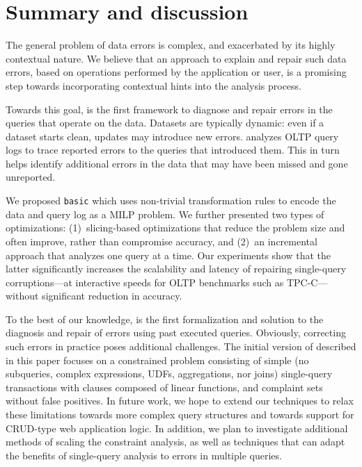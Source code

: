 

\section{Summary and discussion}

The general problem of data errors is complex, and exacerbated by its highly contextual nature.
We believe that an approach to explain and repair such data errors, based on operations performed by the application or user, is a promising step towards incorporating contextual hints into the analysis process.

Towards this goal, \sys is the first framework to diagnose and
repair errors in the queries that operate on the data.
Datasets are typically dynamic: even if a dataset starts clean,
updates may introduce new errors. \sys 
analyzes OLTP query logs to trace reported errors to the queries that
introduced them. This in turn helps identify additional errors
in the data that may have been missed and gone unreported.

We proposed \texttt{basic} which uses non-trivial transformation rules to
encode the data and query log as a MILP problem. We further 
presented two types of optimizations: 
(1)~slicing-based optimizations that reduce the problem
size and often improve, rather than compromise accuracy, and 
(2)~an incremental approach that analyzes one query at a time. 
Our experiments show that the latter significantly increases the scalability and latency of repairing single-query corruptions---at interactive speeds for OLTP benchmarks such as TPC-C---without significant reduction in accuracy.

To the best of our knowledge, \sys is the first formalization and solution to the diagnosis
and repair of errors using past executed queries. 
Obviously, correcting such errors in practice poses additional challenges. 
The initial version of \sys described in this paper focuses on a constrained problem consisting of
simple (no subqueries, complex expressions, UDFs, aggregations, nor joins)
single-query transactions with clauses composed of linear functions, and
complaint sets without false positives.
In future work, we hope to extend our techniques to relax these limitations towards more complex query structures and towards support for CRUD-type web application logic.
In addition, we plan to investigate additional methods of scaling the constraint analysis, 
as well as techniques that can adapt the benefits of single-query analysis to errors in multiple queries. 



